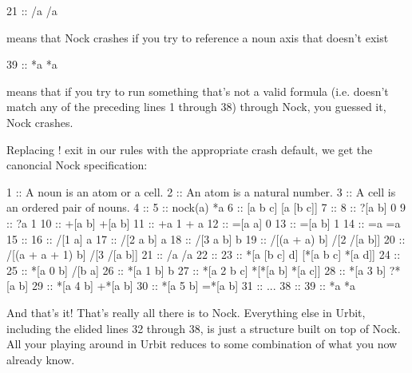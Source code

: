 \begin{code}
   21 ::    /a               /a
\end{code}
means that Nock crashes if you try to reference a noun axis that doesn't exist

\begin{code}
39 ::    *a               *a
\end{code}
means that if you try to run something that's not a valid formula (i.e. doesn't match any of the preceding lines 1 through 38) through Nock, you guessed it, Nock crashes.

Replacing ! exit in our rules with the appropriate crash default, we get the canoncial Nock specification:

\begin{code}
1  ::    A noun is an atom or a cell.
2  ::    An atom is a natural number.
3  ::    A cell is an ordered pair of nouns.
4  ::
5  ::    nock(a)          *a
6  ::    [a b c]          [a [b c]]
7  ::
8  ::    ?[a b]           0
9  ::    ?a               1
10 ::    +[a b]           +[a b]
11 ::    +a               1 + a
12 ::    =[a a]           0
13 ::    =[a b]           1
14 ::    =a               =a
15 ::
16 ::    /[1 a]           a
17 ::    /[2 a b]         a
18 ::    /[3 a b]         b
19 ::    /[(a + a) b]     /[2 /[a b]]
20 ::    /[(a + a + 1) b] /[3 /[a b]]
21 ::    /a               /a
22 ::
23 ::    *[a [b c] d]     [*[a b c] *[a d]]
24 ::
25 ::    *[a 0 b]         /[b a]
26 ::    *[a 1 b]         b
27 ::    *[a 2 b c]       *[*[a b] *[a c]]
28 ::    *[a 3 b]         ?*[a b]
29 ::    *[a 4 b]         +*[a b]
30 ::    *[a 5 b]         =*[a b]
31 ::
...
38 ::
39 ::    *a               *a

\end{code}

And that's it! That's really all there is to Nock. Everything else in Urbit, including the elided lines 32 through 38, is just a structure built on top of Nock. All your playing around in Urbit reduces to some combination of what you now already know.